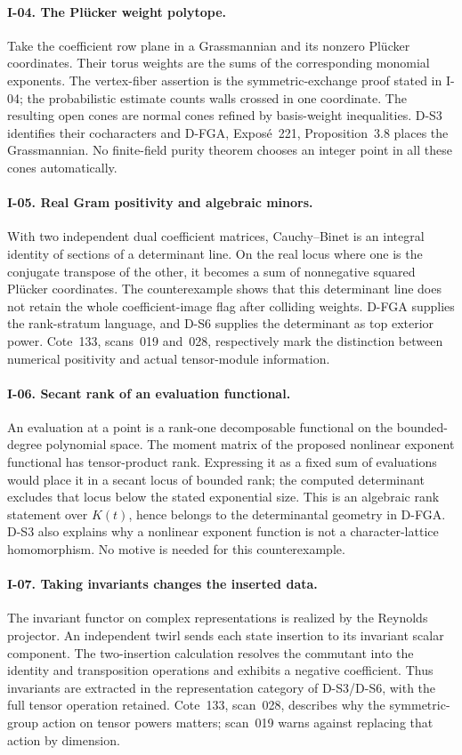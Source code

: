 \paragraph{I-04. The Pl\"ucker weight polytope.}
Take the coefficient row plane in a Grassmannian and its nonzero Pl\"ucker coordinates. Their torus weights are the sums of the corresponding monomial exponents. The vertex-fiber assertion is the symmetric-exchange proof stated in I-04; the probabilistic estimate counts walls crossed in one coordinate. The resulting open cones are normal cones refined by basis-weight inequalities. D-S3 identifies their cocharacters and D-FGA, Expos\'e~221, Proposition~3.8 places the Grassmannian. No finite-field purity theorem chooses an integer point in all these cones automatically.

\paragraph{I-05. Real Gram positivity and algebraic minors.}
With two independent dual coefficient matrices, Cauchy--Binet is an integral identity of sections of a determinant line. On the real locus where one is the conjugate transpose of the other, it becomes a sum of nonnegative squared Pl\"ucker coordinates. The counterexample shows that this determinant line does not retain the whole coefficient-image flag after colliding weights. D-FGA supplies the rank-stratum language, and D-S6 supplies the determinant as top exterior power. Cote~133, scans~019 and~028, respectively mark the distinction between numerical positivity and actual tensor-module information.

\paragraph{I-06. Secant rank of an evaluation functional.}
An evaluation at a point is a rank-one decomposable functional on the bounded-degree polynomial space. The moment matrix of the proposed nonlinear exponent functional has tensor-product rank. Expressing it as a fixed sum of evaluations would place it in a secant locus of bounded rank; the computed determinant excludes that locus below the stated exponential size. This is an algebraic rank statement over $K(t)$, hence belongs to the determinantal geometry in D-FGA. D-S3 also explains why a nonlinear exponent function is not a character-lattice homomorphism. No motive is needed for this counterexample.

\paragraph{I-07. Taking invariants changes the inserted data.}
The invariant functor on complex representations is realized by the Reynolds projector. An independent twirl sends each state insertion to its invariant scalar component. The two-insertion calculation resolves the commutant into the identity and transposition operations and exhibits a negative coefficient. Thus invariants are extracted in the representation category of D-S3/D-S6, with the full tensor operation retained. Cote~133, scan~028, describes why the symmetric-group action on tensor powers matters; scan~019 warns against replacing that action by dimension.

